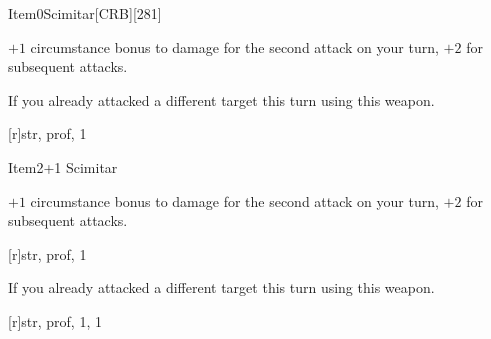 
\begin{card}{Item}{0}{Scimitar}[CRB][281]



\(+1\) circumstance bonus to damage for the second attack on your turn,
\(+2\) for subsequent attacks.




If you already attacked a different target this turn using this weapon.

[r]{str, prof, 1}

\vfill

\end{card}


\begin{card}{Item}{2}{+1 Scimitar}



\(+1\) circumstance bonus to damage for the second attack on your turn,
\(+2\) for subsequent attacks.


[r]{str, prof, 1}


If you already attacked a different target this turn using this weapon.

[r]{str, prof, 1, 1}

\vfill

%
\end{card}
